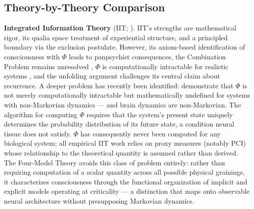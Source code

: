 \documentclass[12pt]{article}
\begin{document}
\subsection{Theory-by-Theory Comparison}


\textbf{Integrated Information Theory} (IIT; \citealp{Tononi2004,Albantakis2023}). IIT's strengths are mathematical rigor, its qualia space treatment of experiential structure, and a principled boundary via the exclusion postulate. However, its axiom-based identification of consciousness with $\Phi$ leads to panpsychist consequences, the Combination Problem remains unresolved \citep{Chalmers2016}, $\Phi$ is computationally intractable for realistic systems \citep{Aaronson2014}, and the unfolding argument \citep{Doerig2019} challenges its central claim about recurrence. A deeper problem has recently been identified: \citet{Barrett2026} demonstrate that $\Phi$ is not merely computationally intractable but mathematically undefined for systems with non-Markovian dynamics --- and brain dynamics are non-Markovian. The algorithm for computing $\Phi$ requires that the system's present state uniquely determines the probability distribution of its future state, a condition neural tissue does not satisfy. $\Phi$ has consequently never been computed for any biological system; all empirical IIT work relies on proxy measures (notably PCI) whose relationship to the theoretical quantity is assumed rather than derived. The Four-Model Theory avoids this class of problem entirely: rather than requiring computation of a scalar quantity across all possible physical grainings, it characterizes consciousness through the functional organization of implicit and explicit models operating at criticality --- a distinction that maps onto observable neural architecture without presupposing Markovian dynamics.
\end{document}
